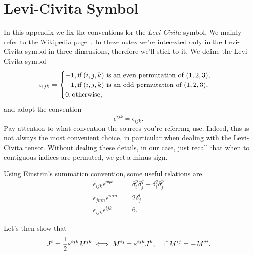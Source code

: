 \section{Levi-Civita Symbol}\label{app:levi-civita}
In this appendix we fix the conventions for the \emph{Levi-Civita} symbol. We mainly refer to the Wikipedia page~\cite{wikipedia}. In these notes we're interested only in the Levi-Civita symbol in three dimensions, therefore we'll stick to it. We define the Levi-Civita symbol
\begin{equation}
    \epsilon_{ijk} = 
    \begin{cases}
        +1, \textup{if $(i,j,k)$ is an even permutation of $(1,2,3)$}, \\
        -1, \textup{if $(i,j,k)$ is an odd permutation of $(1,2,3)$},\\
        0, \textup{otherwise} ,
    \end{cases}
\end{equation}
and adopt the convention
\begin{equation*}
    \epsilon^{ijk} = \epsilon_{ijk}.
\end{equation*}
Pay attention to what convention the sources you're referring use. Indeed, this is not always the most convenient choice, in particular when dealing with the Levi-Civita tensor. Without dealing these details, in our case, just recall that when to contiguous indices are permuted, we get a minus sign.

Using Einstein's summation convention, some useful relations are
\begin{subequations}
\begin{align}
    \epsilon_{ijk} \epsilon^{pqk} &= \delta^p_i \delta^q_j - \delta^q_i \delta^p_j \label{appeq:levi-civita-delta} \\
    \epsilon_{jmn} \epsilon^{imn} &= 2 \delta^i_j \\
    \epsilon_{ijk} \epsilon^{ijk} &= 6 .
\end{align}
\end{subequations}

Let's then show that
\begin{equation*}
    J^i = \frac{1}{2} \epsilon^{ijk} M^{jk} \iff M^{ij} = \epsilon^{ijk} J^k, \quad \textup{if $M^{ij} = -M^{ji}$.}
\end{equation*}

